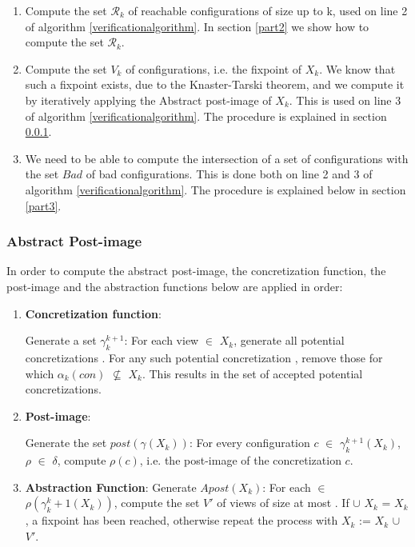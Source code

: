 \begin{enumerate}
\item
Compute the set $\mathcal{R}_k$ of reachable configurations of size up to k, used on line 2 of algorithm \ref{verificationalgorithm}. In section \ref{part2} we show how to compute the set $\mathcal{R}_k$.

\item
Compute the set $V_k$ of configurations, i.e. the fixpoint of $X_k$. We know that such a fixpoint exists, due to the Knaster-Tarski theorem\cite{tarski}, and we compute it by iteratively applying the Abstract post-image of $X_k$. This is used on line 3 of algorithm \ref{verificationalgorithm}. The procedure is explained in section \ref{part1}.
\item
We need to be able to compute the intersection of a set of configurations with the set $Bad$ of bad configurations. This is done both on line 2 and 3 of algorithm \ref{verificationalgorithm}. The procedure is explained below in section \ref{part3}.
\end{enumerate}

\subsubsection{Abstract Post-image}
\label{part1}
In order to compute the abstract post-image, the concretization function, the post-image and the abstraction functions below are applied in order:

\begin{enumerate}
\item
\textbf{Concretization function}:

Generate a set $\gamma_k^{k+1}$: For each view  $\in$ $X_k$, generate all potential concretizations . For any such potential concretization , remove those for which $\alpha_k(con)$ $\not\subseteq$ $X_k$. This results in the set of accepted potential concretizations.

\item
\textbf{Post-image}:

Generate the set $post(\gamma(X_k))$: For every configuration $c$ $\in$ $\gamma_k^{k+1}(X_k)$, $\rho$ $\in$ $\delta$, compute $\rho(c)$, i.e. the post-image of the concretization $c$.

\item
\textbf{Abstraction Function}:
Generate $Apost(X_k)$: For each  $\in$ $\rho(\gamma_k^k+1(X_k))$, compute the set $V'$ of views of size at most . If  $\cup$ $X_k$ = $X_k$, a fixpoint has been reached, otherwise repeat the process with $X_k$ := $X_k$ $\cup$ $V'$.
\end{enumerate}

